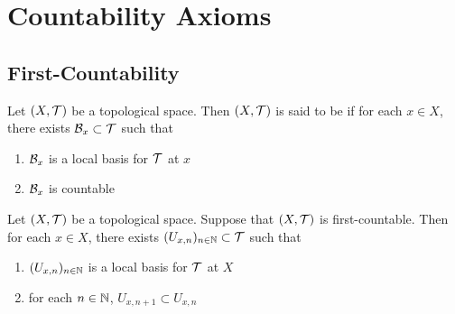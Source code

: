 \documentclass{book}
\begin{document}
	
	
	
	
	
	
	
	
	
	
	
	
	
	
	
	\newpage
	\section{Countability Axioms}
	
	\subsection{First-Countability}
	
	\begin{defn} 
		Let $(X, \mathcal{T})$ be a topological space. Then $(X, \mathcal{T})$ is said to be  if for each $x \in X$, there exists $\mathcal{B}_x \subset \mathcal{T}$ such that 
		\begin{enumerate}
			\item $\mathcal{B}_x$ is a local basis for $\mathcal{T}$ at $x$
			\item $\mathcal{B}_x$ is countable
		\end{enumerate}
	\end{defn}

	\begin{ex} 
		Let $(X, \mathcal{T})$ be a topological space. Suppose that $(X, \mathcal{T})$ is first-countable. Then for each $x \in X$, there exists $(U_{x, n})_{n \in \mathbb{N}} \subset \mathcal{T}$ such that 
		\begin{enumerate}
			\item $(U_{x, n})_{n \in \mathbb{N}}$ is a local basis for $\mathcal{T}$ at $X$
			\item for each $n \in \mathbb{N}$, $U_{x, n+1} \subset U_{x, n}$
		\end{enumerate}
	\end{ex}
\end{document}
